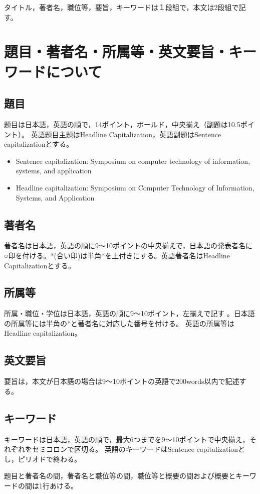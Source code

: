 \documentclass[base=10pt,magstyle=real,a4paper,twocolumn,xelatex,pandoc,jafont=ms]{bxjsarticle}%
\begin{document}
タイトル，著者名，職位等，要旨，キーワードは１段組で，本文は2段組で記す。


\section{題目・著者名・所属等・英文要旨・キーワードについて}
\subsection{題目}
題目は日本語，英語の順で，14ポイント，ボールド，中央揃え（副題は10.5ポイント）。
英語題目主題はHeadline Capitalization，英語副題はSentence capitalizationとする。
\begin{itemize}
	\item Sentence capitalization: Symposium on computer technology of information, systems, and application 
	\item Headline capitalization: Symposium on Computer Technology of Information, Systems, and Application
\end{itemize}

\subsection{著者名}
著者名は日本語，英語の順に9～10ポイントの中央揃えで，日本語の発表者名に○印を付ける。*(合い印)は半角*を上付きにする。英語著者名はHeadline Capitalizationとする。

\subsection{所属等}
所属・職位・学位は日本語，英語の順に9～10ポイント，左揃えで記す
。日本語の所属等には半角の*と著者名に対応した番号を付ける。
英語の所属等はHeadline capitalization。

\subsection{英文要旨}
要旨は，本文が日本語の場合は9～10ポイントの英語で200words以内で記述する。

\subsection{キーワード}
キーワードは日本語，英語の順で，最大6つまでを9～10ポイントで中央揃え，それぞれをセミコロンで区切る。
英語のキーワードはSentence capitalizationとし，ピリオドで終わる。

題目と著者名の間，著者名と職位等の間，職位等と概要の間および概要とキーワードの間は1行あける。
\end{document}
